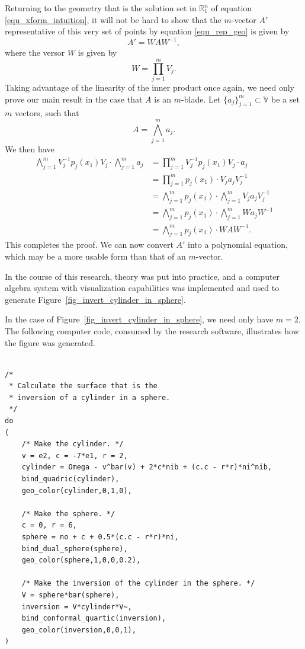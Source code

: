 \documentclass{ecgd-l}
\theoremstyle{definition}
\theoremstyle{remark}
\numberwithin{equation}{section}
\newcommand{\V}{\mathbb{V}}
\newcommand{\R}{\mathbb{R}}
\begin{document}
Returning to the geometry that is the solution set in $\R_1^n$
of equation \eqref{equ_xform_intuition},
it will not be hard to show that the $m$-vector $A'$ representative
of this very set of points by equation \eqref{equ_rep_geo} is given by
\begin{equation*}
A' = WAW^{-1},
\end{equation*}
where the versor $W$ is given by
\begin{equation*}
W = \prod_{j=1}^m V_j.
\end{equation*}
Taking advantage of the linearity of the inner product once again,
we need only prove our main result in the case that $A$ is an $m$-blade.
Let $\{a_j\}_{j=1}^m\subset \V$ be a set $m$ vectors, such that
\begin{equation*}
A = \bigwedge_{j=1}^m a_j.
\end{equation*}
We then have
\begin{align}
\bigwedge_{j=1}^m V_j^{-1}p_j(x_1)V_j\cdot\bigwedge_{j=1}^m a_j &=
\prod_{j=1}^m V_j^{-1}p_j(x_1)V_j\cdot a_j\nonumber \\
 &= \prod_{j=1}^m p_j(x_1)\cdot V_ja_jV_j^{-1}\nonumber \\
&= \bigwedge_{j=1}^m p_j(x_1)\cdot\bigwedge_{j=1}^m V_ja_jV_j^{-1}\nonumber \\
&= \bigwedge_{j=1}^m p_j(x_1)\cdot\bigwedge_{j=1}^m Wa_jW^{-1}\nonumber \\
&= \bigwedge_{j=1}^m p_j(x_1)\cdot WAW^{-1}.\nonumber
\end{align}
This completes the proof.
We can now convert $A'$ into a polynomial equation, which
may be a more usable form than that of an $m$-vector.

In the course of this research, theory was put into practice, and a computer algebra
system with visualization capabilities was implemented and used to generate
Figure~\ref{fig_invert_cylinder_in_sphere}.

In the case of Figure~\ref{fig_invert_cylinder_in_sphere}, we need only
have $m=2$.  The following computer code, consumed by the research
software, illustrates how the figure was generated.
\begin{center}
{\tiny
\begin{verbatim}

/*
 * Calculate the surface that is the
 * inversion of a cylinder in a sphere.
 */
do
(
    /* Make the cylinder. */
    v = e2, c = -7*e1, r = 2,
    cylinder = Omega - v^bar(v) + 2*c*nib + (c.c - r*r)*ni^nib,
    bind_quadric(cylinder),
    geo_color(cylinder,0,1,0),
	
    /* Make the sphere. */
    c = 0, r = 6,
    sphere = no + c + 0.5*(c.c - r*r)*ni,
    bind_dual_sphere(sphere),
    geo_color(sphere,1,0,0,0.2),
	
    /* Make the inversion of the cylinder in the sphere. */
    V = sphere*bar(sphere),
    inversion = V*cylinder*V~,
    bind_conformal_quartic(inversion),
    geo_color(inversion,0,0,1),
)

\end{verbatim}
}
\end{center}
\end{document}
